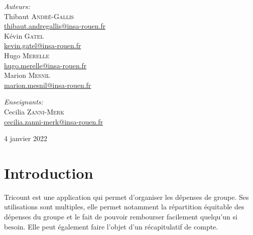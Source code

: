 \documentclass[12,french]{report}
\begin{document}
\begin{titlepage}
\begin{center}
	\begin{minipage}{0.4\textwidth}
		\begin{flushleft} \large
			\emph{Auteurs:}\\
			Thibaut \textsc{André-Gallis} \\
			{\small\href{mailto:thibaut.andregallis@insa-rouen.fr}{thibaut.andregallis@insa-rouen.fr}} \\
			Kévin \textsc{Gatel} \\
			{\small\href{mailto:kevin.gatel@insa-rouen.fr}{kevin.gatel@insa-rouen.fr}}\\
			Hugo \textsc{Merelle} \\
			{\small\href{mailto:hugo.merelle@insa-rouen.fr}{hugo.merelle@insa-rouen.fr}}\\
			Marion \textsc{Mesnil} \\
			{\small\href{mailto:marion.mesnil@insa-rouen.fr}{marion.mesnil@insa-rouen.fr}}\\
		\end{flushleft}
	\end{minipage}
	\begin{minipage}{0.4\textwidth}
		\begin{flushright} \large
			\emph{Enseignants:} \\
			Cecilia \textsc{Zanni-Merk} \\
			{\small\href{mailto:cecilia.zanni-merk@insa-rouen.fr}								{cecilia.zanni-merk@insa-rouen.fr}}\\
		\end{flushright}
	\end{minipage}

	\vfill
	{\large 4 janvier 2022}
\end{center}
\end{titlepage}

\tableofcontents
\listoffigures

\renewcommand{\chaptername}{}
\chapter*{Introduction}

Tricount est une application qui permet d'organiser les dépenses de groupe. Ses utilisations sont multiples, elle permet notamment la répartition équitable des dépenses du groupe et le fait de pouvoir rembourser facilement quelqu'un si besoin. Elle peut également faire l’objet d’un récapitulatif de compte.\\
\end{document}
